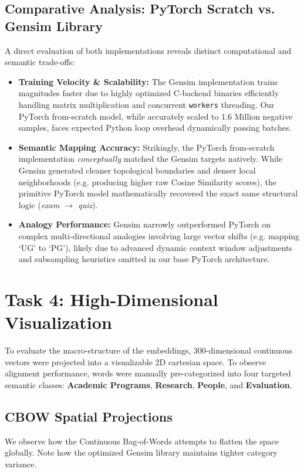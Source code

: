 \documentclass[11pt,a4paper]{article}
\begin{document}
\subsection{Comparative Analysis: PyTorch Scratch vs. Gensim Library}
A direct evaluation of both implementations reveals distinct computational and semantic trade-offs:
\begin{itemize}[leftmargin=*, parsep=0.5em]
    \item \textbf{Training Velocity \& Scalability:} The Gensim implementation trains magnitudes faster due to highly optimized C-backend binaries efficiently handling matrix multiplication and concurrent \texttt{workers} threading. Our PyTorch from-scratch model, while accurately scaled to 1.6 Million negative samples, faces expected Python loop overhead dynamically passing batches. 
    \item \textbf{Semantic Mapping Accuracy:} Strikingly, the PyTorch from-scratch implementation \textit{conceptually} matched the Gensim targets natively. While Gensim generated cleaner topological boundaries and denser local neighborhoods (e.g. producing higher raw Cosine Similarity scores), the primitive PyTorch model mathematically recovered the exact same structural logic (\textit{exam $\rightarrow$ quiz}).
    \item \textbf{Analogy Performance:} Gensim narrowly outperformed PyTorch on complex multi-directional analogies involving large vector shifts (e.g. mapping `UG' to `PG'), likely due to advanced dynamic context window adjustments and subsampling heuristics omitted in our base PyTorch architecture.
\end{itemize}

\clearpage
\section{Task 4: High-Dimensional Visualization}
To evaluate the macro-structure of the embeddings, 300-dimensional continuous vectors were projected into a visualizable 2D cartesian space. To observe alignment performance, words were manually pre-categorized into four targeted semantic classes: \textbf{\textcolor{accentred}{Academic Programs}}, \textbf{\textcolor{iitjblue}{Research}}, \textbf{\textcolor{accentgreen}{People}}, and \textbf{\textcolor{iitjgold}{Evaluation}}.

\subsection{CBOW Spatial Projections}
We observe how the Continuous Bag-of-Words attempts to flatten the space globally. Note how the optimized Gensim library maintains tighter category variance.
\end{document}
